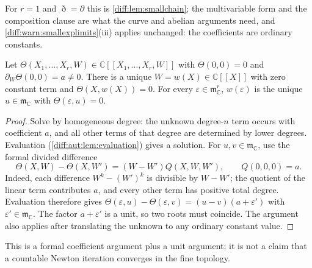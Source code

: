 \documentclass[11pt,letterpaper]{article}
\numberwithin{equation}{section}
\theoremstyle{definition}
\theoremstyle{remark}
\newcommand{\C}{\mathbb C}
\newcommand{\der}{\partial}
\newcommand{\mm}{\mathfrak m}
\newcommand{\Dn}{\eth}
\begin{document}
For $r=1$ and $\Dn=\der$ this is \cref{diff:lem:smallchain}; the multivariable
form and the composition clause are what the curve and abelian arguments need,
and \cref{diff:warn:smallexplimits}(iii) applies unchanged: the coefficients are
ordinary constants.

\begin{lemma}
\label{diff:aut:lem:implicit}
Let $\Theta(X_{1},\dots,X_{r},W)\in\C[[X_{1},\dots,X_{r},W]]$ with
$\Theta(0,0)=0$ and $\partial_{W}\Theta(0,0)=a\neq0$. There is a unique
$W=w(X)\in\C[[X]]$ with zero constant term and $\Theta(X,w(X))=0$. For every
$\varepsilon\in\mm_{\C}^{r}$, $w(\varepsilon)$ is the unique $u\in\mm_{\C}$ with
$\Theta(\varepsilon,u)=0$.
\end{lemma}
\begin{proof}
Solve by homogeneous degree: the unknown degree-$n$ term occurs with coefficient
$a$, and all other terms of that degree are determined by lower degrees.
Evaluation (\cref{diff:aut:lem:evaluation}) gives a solution. For
$u,v\in\mm_{\C}$, use the formal divided difference
\[
 \Theta(X,W)-\Theta(X,W')=(W-W')Q(X,W,W'),
 \qquad Q(0,0,0)=a.
\]
Indeed, each difference $W^k-(W')^k$ is divisible by $W-W'$;
the quotient of the linear term contributes $a$, and every other
term has positive total degree. Evaluation therefore gives
$\Theta(\varepsilon,u)-\Theta(\varepsilon,v)
 =(u-v)(a+\varepsilon')$ with $\varepsilon'\in\mm_{\C}$.
The factor $a+\varepsilon'$ is a unit, so two roots must coincide. The argument also
applies after translating the unknown to any ordinary constant value.
\end{proof}

This is a formal coefficient argument plus a unit argument; it is not a claim
that a countable Newton iteration converges in the fine topology.
\end{document}
